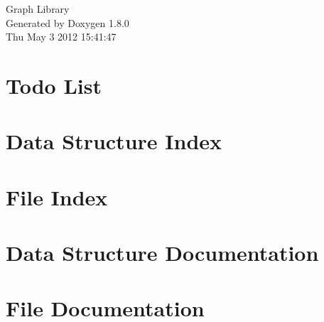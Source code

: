 \documentclass{book}
\begin{document}
\hypersetup{pageanchor=false,citecolor=blue}
\begin{titlepage}
\vspace*{7cm}
\begin{center}
{\Large Graph Library }\\
\vspace*{1cm}
{\large Generated by Doxygen 1.8.0}\\
\vspace*{0.5cm}
{\small Thu May 3 2012 15:41:47}\\
\end{center}
\end{titlepage}
\clearemptydoublepage
{}
\tableofcontents
\clearemptydoublepage
{}
\hypersetup{pageanchor=true,citecolor=blue}
\chapter{Todo List}
\label{todo}
\hypertarget{todo}{}

\chapter{Data Structure Index}

\chapter{File Index}

\chapter{Data Structure Documentation}







\chapter{File Documentation}





















\printindex
\end{document}
